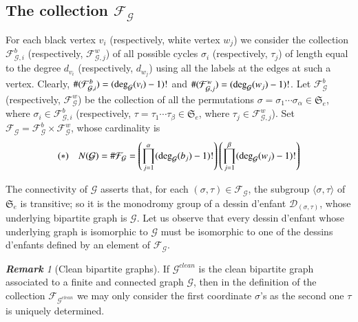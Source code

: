 \documentclass[12pt]{amsart}
\theoremstyle{remark}
\newtheorem{rema}{\bf Remark}
\begin{document}
\subsection{The collection ${\mathcal F}_{\mathcal G}$}
For each black vertex $v_{i}$ (respectively, white vertex $w_{j}$) we consider the collection ${\mathcal F}_{{\mathcal G},i}^{b}$ (respectively, ${\mathcal F}_{{\mathcal G},j}^{w}$) of all possible cycles $\sigma_{i}$ (respectively, $\tau_{j}$) of length equal to the degree $d_{v_{i}}$ (respectively, $d_{w_{j}}$) using all the labels at the edges at such a vertex. Clearly,  $\#({\mathcal F}_{{\mathcal G},i}^{b})=({\rm deg}_{\mathcal G}(v_{i})-1)!$ and $\#({\mathcal F}_{{\mathcal G},j}^{w})=({\rm deg}_{\mathcal G}(w_{j})-1)!$. Let ${\mathcal F}_{\mathcal G}^{b}$ (respectively, ${\mathcal F}_{\mathcal G}^{w}$) 
be the collection of all the permutations $\sigma=\sigma_{1}\cdots\sigma_{\alpha} \in {\mathfrak S}_{e}$, where $\sigma_{i} \in {\mathcal F}_{{\mathcal G},i}^{b}$ (respectively, $\tau=\tau_{1}\cdots\tau_{\beta} \in {\mathfrak S}_{e}$, where $\tau_{j} \in {\mathcal F}_{{\mathcal G},j}^{w}$). Set 
${\mathcal F}_{\mathcal G}={\mathcal F}_{\mathcal G}^{b} \times {\mathcal F}_{\mathcal G}^{w}$, whose cardinality is
$$(*) \quad N({\mathcal G})=\#{\mathcal F}_{\mathcal G}=\left(\prod_{j=1}^{\alpha} ({\rm deg}_{\mathcal G}(b_{j})-1)! \right)
\left( \prod_{j=1}^{\beta} ({\rm deg}_{\mathcal G}(w_{j})-1)! \right)$$

The connectivity of ${\mathcal G}$ asserts that, for each $(\sigma,\tau) \in {\mathcal F}_{\mathcal G}$, the subgroup $\langle \sigma, \tau\rangle$ of ${\mathfrak S}_{e}$ is transitive; so it is the monodromy group of a dessin d'enfant ${\mathcal D}_{(\sigma,\tau)}$, whose underlying bipartite graph is ${\mathcal G}$.  Let us observe that every dessin d'enfant whose underlying graph is isomorphic to ${\mathcal G}$ must be isomorphic to one of the dessins d'enfants defined by an element of ${\mathcal F}_{\mathcal G}$.

{\vspace{0.3cm}}
\noindent
\begin{rema}[Clean bipartite graphs]
If ${\mathcal G}^{clean}$ is the clean bipartite graph associated to a finite and connected graph ${\mathcal G}$, then 
in the definition of the collection ${\mathcal F}_{{\mathcal G}^{clean}}$ we may only consider the first coordinate $\sigma$'s as the second one $\tau$ is uniquely determined. 
\end{rema}

{\vspace{0.3cm}}
\end{document}
